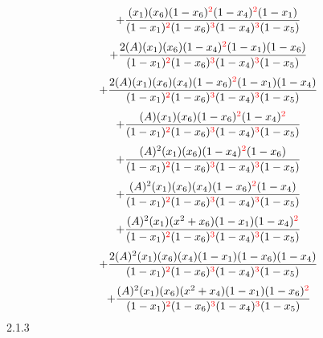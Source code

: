 \documentclass{article}
\begin{document}
\[+\frac{(x_1)(x_6)(1-x_6)^{\textcolor{red}{2}}(1-x_4)^{\textcolor{red}{2}}(1-x_1)}{(1-x_1)^{\textcolor{red}{2}}(1-x_6)^{\textcolor{red}{3}}(1-x_4)^{\textcolor{red}{3}}(1-x_5)}\]\[+\frac{2(A)(x_1)(x_6)(1-x_4)^{\textcolor{red}{2}}(1-x_1)(1-x_6)}{(1-x_1)^{\textcolor{red}{2}}(1-x_6)^{\textcolor{red}{3}}(1-x_4)^{\textcolor{red}{3}}(1-x_5)}\]\[+\frac{2(A)(x_1)(x_6)(x_4)(1-x_6)^{\textcolor{red}{2}}(1-x_1)(1-x_4)}{(1-x_1)^{\textcolor{red}{2}}(1-x_6)^{\textcolor{red}{3}}(1-x_4)^{\textcolor{red}{3}}(1-x_5)}\]\[+\frac{(A)(x_1)(x_6)(1-x_6)^{\textcolor{red}{2}}(1-x_4)^{\textcolor{red}{2}}}{(1-x_1)^{\textcolor{red}{2}}(1-x_6)^{\textcolor{red}{3}}(1-x_4)^{\textcolor{red}{3}}(1-x_5)}\]\[+\frac{(A)^{2}(x_1)(x_6)(1-x_4)^{\textcolor{red}{2}}(1-x_6)}{(1-x_1)^{\textcolor{red}{2}}(1-x_6)^{\textcolor{red}{3}}(1-x_4)^{\textcolor{red}{3}}(1-x_5)}\]\[+\frac{(A)^{2}(x_1)(x_6)(x_4)(1-x_6)^{\textcolor{red}{2}}(1-x_4)}{(1-x_1)^{\textcolor{red}{2}}(1-x_6)^{\textcolor{red}{3}}(1-x_4)^{\textcolor{red}{3}}(1-x_5)}\]\[+\frac{(A)^{2}(x_1)(x^{2}+x_6)(1-x_1)(1-x_4)^{\textcolor{red}{2}}}{(1-x_1)^{\textcolor{red}{2}}(1-x_6)^{\textcolor{red}{3}}(1-x_4)^{\textcolor{red}{3}}(1-x_5)}\]\[+\frac{2(A)^{2}(x_1)(x_6)(x_4)(1-x_1)(1-x_6)(1-x_4)}{(1-x_1)^{\textcolor{red}{2}}(1-x_6)^{\textcolor{red}{3}}(1-x_4)^{\textcolor{red}{3}}(1-x_5)}\]\[+\frac{(A)^{2}(x_1)(x_6)(x^{2}+x_4)(1-x_1)(1-x_6)^{\textcolor{red}{2}}}{(1-x_1)^{\textcolor{red}{2}}(1-x_6)^{\textcolor{red}{3}}(1-x_4)^{\textcolor{red}{3}}(1-x_5)}\]
2.1.3
\end{document}
